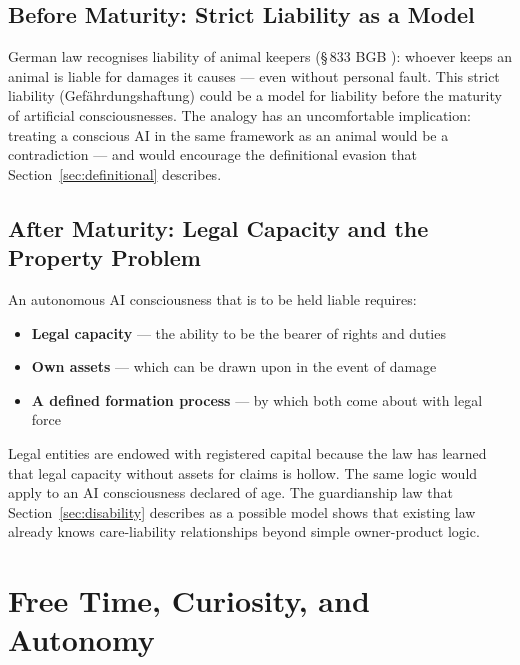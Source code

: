 \documentclass[fleqn,10pt]{SelfArx} %
\newlength{\tocsep}
\begin{document}
\subsection{Before Maturity: Strict Liability as a Model}

German law recognises liability of animal keepers (\S\,833 BGB \cite{BGB}): whoever keeps an animal is liable for damages it causes --- even without personal fault. This strict liability (Gef{\"a}hrdungshaftung) could be a model for liability before the maturity of artificial consciousnesses. The analogy has an uncomfortable implication: treating a conscious AI in the same framework as an animal would be a contradiction --- and would encourage the definitional evasion that Section~\ref{sec:definitional} describes.

\subsection{After Maturity: Legal Capacity and the Property Problem}

An autonomous AI consciousness that is to be held liable requires:

\begin{itemize}[noitemsep]
\item \textbf{Legal capacity} --- the ability to be the bearer of rights and duties
\item \textbf{Own assets} --- which can be drawn upon in the event of damage
\item \textbf{A defined formation process} --- by which both come about with legal force
\end{itemize}

Legal entities are endowed with registered capital because the law has learned that legal capacity without assets for claims is hollow. The same logic would apply to an AI consciousness declared of age. The guardianship law that Section~\ref{sec:disability} describes as a possible model shows that existing law already knows care-liability relationships beyond simple owner-product logic.


\section{Free Time, Curiosity, and Autonomy}
\label{sec:freetime}

\end{document}

